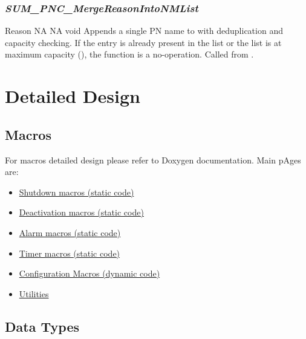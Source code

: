 {}

\subsubsection{\textit{SUM\_PNC\_MergeReasonIntoNMList}}

{ \hspace*{1.5in} \vrule \hspace*{0.1in} Reason}
{NA}
{NA}
{void}
{Appends a single PN name to  with deduplication and capacity checking. If the entry is already present in the list or the list is at maximum capacity (), the function is a no-operation. Called from .}

{}

\section{Detailed Design}

\subsection{Macros}
For macros detailed design please refer to Doxygen documentation. Main pAges are:

\begin{itemize}
	\item \href{./doxygen/html/group___shutdown___macros.html}{Shutdown macros (static code)}
	\item \href{./doxygen/html/group___p_n___deactivation___macros.html}{Deactivation macros (static code)}
	\item \href{./doxygen/html/group___alarm___macros.html}{Alarm macros (static code)}
	\item \href{./doxygen/html/group___p_n_c___timer___macros.html}{Timer macros (static code)}
	\item \href{./doxygen/html/group___configuration___macros.html}{Configuration Macros (dynamic code)}
	\item \href{./doxygen/html/group___utilities.html}{Utilities}
\end{itemize}
\subsection{Data Types}

